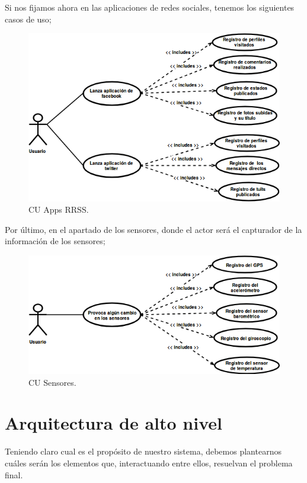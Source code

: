 \documentclass[12pt,a4paper,oneside]{book} %
\begin{document}
Si nos fijamos ahora en las aplicaciones de redes sociales, tenemos los siguientes casos de uso; 
\begin{figure}[H]
	\begin{center}
		\includegraphics[scale=0.70]{pictures/usecases/usecases05.png} %
	\end{center}
	\caption[Casos de uso 05]{CU Apps RRSS.}
\end{figure}
Por último, en el apartado de los sensores, donde el actor será el capturador de la información de los sensores; 
\begin{figure}[H]
	\begin{center}
		\includegraphics[scale=0.70]{pictures/usecases/usecases06.png} %
	\end{center}
	\caption[Casos de uso 06]{CU Sensores.}
\end{figure}
\pagebreak
\section{Arquitectura de alto nivel}
Teniendo claro cual es el propósito de nuestro sistema, debemos plantearnos cuáles serán los elementos que, interactuando entre ellos, resuelvan el problema final. 
\newline 
\newline
 
\end{document}
